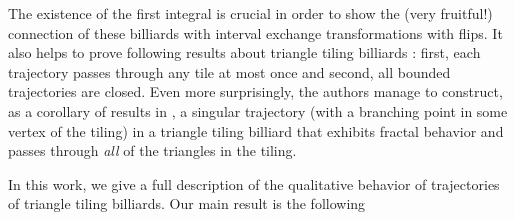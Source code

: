 \documentclass[12pt]{article}
\newtheorem{theorem}{Theorem}
\theoremstyle{definition}
\begin{document}
The existence of the first integral is crucial in order to show the (very fruitful!) connection of these billiards with interval exchange transformations with flips. It also helps to prove following results about triangle tiling billiards : first, each trajectory passes through any tile at most once and second, all bounded trajectories are closed. Even more surprisingly, the authors manage to construct, as a corollary of results in \cite{LPV07}, a singular trajectory (with a branching point in some vertex of the tiling) in a triangle tiling billiard that exhibits fractal behavior and passes through \emph{all} of the triangles in the tiling. 

In this work, we give a full description of the qualitative behavior of trajectories of triangle tiling billiards. Our main result is the following

\end{document}
